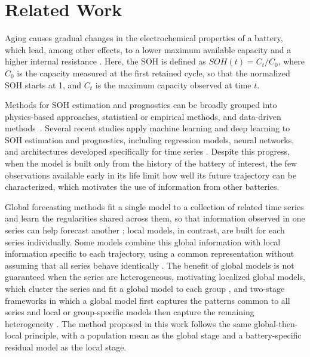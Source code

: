 \documentclass[conference]{IEEEtran}
\begin{document}

\section{Related Work}
\label{sec:fundamentacao}

Aging causes gradual changes in the electrochemical properties of a battery, which lead, among other effects, to a lower maximum available capacity and a higher internal resistance \cite{Desai2025MultiTimescale,Lyu2025TransferPack}. Here, the SOH is defined as $SOH(t)=C_t/C_0$,
where $C_0$ is the capacity measured at the first retained cycle, so that the normalized SOH starts at 1, and $C_t$ is the maximum capacity observed at time $t$.

Methods for SOH estimation and prognostics can be broadly grouped into physics-based approaches, statistical or empirical methods, and data-driven methods~\cite{sylvestrin2025state}.
Several recent studies apply machine learning and deep learning to SOH estimation and prognostics, including regression models, neural networks, and architectures developed specifically for time series \cite{Liu2025SodiumSOH,Desai2025MultiTimescale}. Despite this progress, when the model is built only from the history of the battery of interest, the few observations available early in its life limit how well its future trajectory can be characterized, which motivates the use of information from other batteries.

Global forecasting methods fit a single model to a collection of related time series and learn the regularities shared across them, so that information observed in one series can help forecast another \cite{montero2021global}%
; local models, in contrast, are built for each series individually.
Some models combine this global information with local information specific to each trajectory, using a common representation without assuming that all series behave identically \cite{wang2019deepfactors}. The benefit of global models is not guaranteed when the series are heterogeneous, motivating localized global models, which cluster the series and fit a global model to each group \cite{abbasimehr2025localized}, and two-stage frameworks in which a global model first captures the patterns common to all series and local or group-specific models then capture the remaining heterogeneity \cite{ren2025boosting}. The method proposed in this work follows the same global-then-local principle, with a population mean as the global stage and a battery-specific residual model as the local stage.
\end{document}

